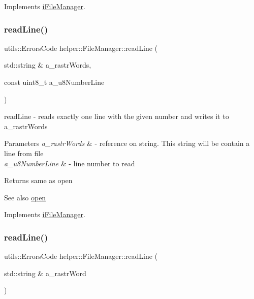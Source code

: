 Implements \mbox{\hyperlink{classi_file_manager}{i\+File\+Manager}}.

\mbox{\label{classhelper_1_1_file_manager_a062addfd443a7b4092f8cab865d8de31}} 
\subsubsection{\texorpdfstring{readLine()}{readLine()}\hspace{0.1cm}{\footnotesize\ttfamily [1/2]}}
{\footnotesize\ttfamily utils\+::\+Errors\+Code helper\+::\+File\+Manager\+::read\+Line (\begin{DoxyParamCaption}\item[{std\+::string \&}]{a\+\_\+rastr\+Words,  }\item[{const uint8\+\_\+t}]{a\+\_\+u8\+Number\+Line }\end{DoxyParamCaption})\hspace{0.3cm}{\ttfamily [virtual]}}



read\+Line -\/ reads exactly one line with the given number and writes it to a\+\_\+rastr\+Words 


\begin{DoxyParams}{Parameters}
{\em a\+\_\+rastr\+Words} & -\/ reference on string. This string will be contain a line from file \\
\hline
{\em a\+\_\+u8\+Number\+Line} & -\/ line number to read \\
\hline
\end{DoxyParams}
\begin{DoxyReturn}{Returns}
same as open 
\end{DoxyReturn}
\begin{DoxySeeAlso}{See also}
\mbox{\hyperlink{classhelper_1_1_file_manager_a0b4bac7ff95be0bdad0b70987a25b63c}{open}} 
\end{DoxySeeAlso}


Implements \mbox{\hyperlink{classi_file_manager}{i\+File\+Manager}}.

\mbox{\label{classhelper_1_1_file_manager_acc1e93732315d48528cb57d440ec4c25}} 
\subsubsection{\texorpdfstring{readLine()}{readLine()}\hspace{0.1cm}{\footnotesize\ttfamily [2/2]}}
{\footnotesize\ttfamily utils\+::\+Errors\+Code helper\+::\+File\+Manager\+::read\+Line (\begin{DoxyParamCaption}\item[{std\+::string \&}]{a\+\_\+rastr\+Word }\end{DoxyParamCaption})\hspace{0.3cm}{\ttfamily [virtual]}}



